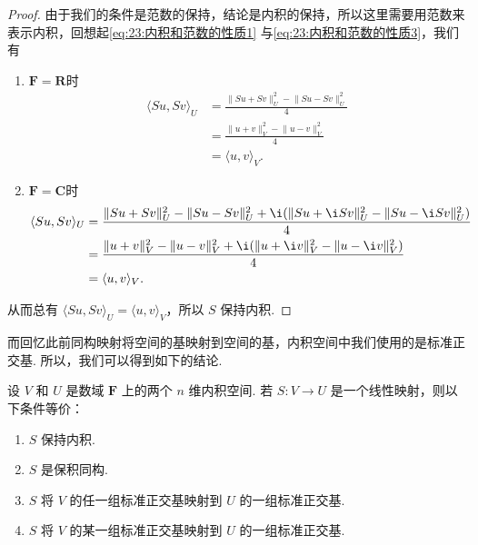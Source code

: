 \begin{proof}
    由于我们的条件是范数的保持，结论是内积的保持，所以这里需要用范数来表示内积，回想起\autoref{eq:23:内积和范数的性质1} 与\autoref{eq:23:内积和范数的性质3}，我们有
    \begin{enumerate}
        \item $\mathbf{F}=\mathbf{R}$时
        \begin{align*}
            \langle Su, Sv \rangle_U & = \frac{\lVert Su + Sv \rVert_U^2 - \lVert Su - Sv \rVert_U^2}{4} \\
                                     & = \frac{\lVert u + v \rVert_V^2 - \lVert u - v \rVert_V^2}{4}     \\
                                     & = \langle u, v \rangle_V.
        \end{align*}
        \item $\mathbf{F}=\mathbf{C}$时
        \begin{align*}
            \langle Su, Sv \rangle_U & = \frac{\lVert Su + Sv \rVert_U^2 - \lVert Su - Sv \rVert_U^2 + \i(\lVert Su + \i Sv \rVert_U^2 - \lVert Su - \i Sv \rVert_U^2)}{4} \\
                                     & = \frac{\lVert u + v \rVert_V^2 - \lVert u - v \rVert_V^2 + \i(\lVert u + \i v \rVert_V^2 - \lVert u - \i v \rVert_V^2)}{4}     \\
                                     & = \langle u, v \rangle_V.
        \end{align*}
    \end{enumerate}
    从而总有 $ \langle Su, Sv \rangle_U = \langle u, v \rangle_V $，所以 $ S $ 保持内积.
\end{proof}

而回忆此前同构映射将空间的基映射到空间的基，内积空间中我们使用的是标准正交基. 所以，我们可以得到如下的结论.

\begin{theorem}{}{}
    设 $ V $ 和 $ U $ 是数域 $ \mathbf{F} $ 上的两个 $ n $ 维内积空间. 若 $ S : V \rightarrow U $ 是一个线性映射，则以下条件等价：
    \begin{enumerate}[label=(\arabic*)]
        \item \label{item:20:保积同构条件:1}
            $ S $ 保持内积.
        \item \label{item:20:保积同构条件:2}
            $ S $ 是保积同构.
        \item \label{item:20:保积同构条件:3}
            $ S $ 将 $ V $ 的任一组标准正交基映射到 $ U $ 的一组标准正交基.
        \item \label{item:20:保积同构条件:4}
            $ S $ 将 $ V $ 的某一组标准正交基映射到 $ U $ 的一组标准正交基.
    \end{enumerate}
\end{theorem}

